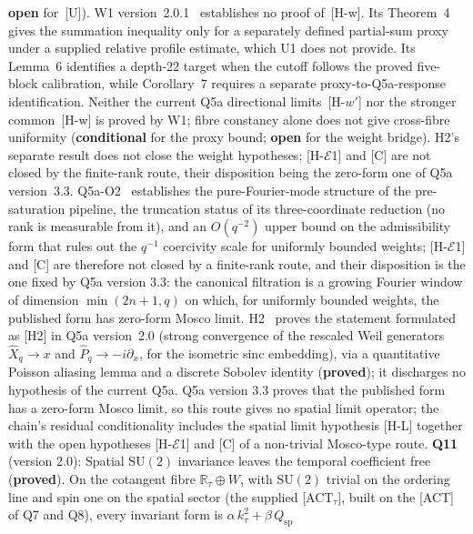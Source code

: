 \documentclass[11pt,a4paper]{article}
\newcommand{\SU}{\mathrm{SU}}
\newcommand{\sproved}{\textcolor{cproved}{\textbf{proved}}}
\newcommand{\sopen}{\textcolor{copen}{\textbf{open}}}
\newcommand{\scond}{\textcolor{ccond}{\textbf{conditional}}}
\begin{document}
    \sopen{} for~[U]).
    W1 version~2.0.1~\cite{Beau2026w1} establishes no proof of~[H-w].
    Its Theorem~4 gives the summation inequality only for a separately defined partial-sum
    proxy under a supplied relative profile estimate, which U1 does not provide.
    Its Lemma~6 identifies a depth-22 target when the cutoff follows the proved five-block
    calibration, while Corollary~7 requires a separate proxy-to-Q5a-response identification.
    Neither the current Q5a directional limits~[H-$w'$] nor the stronger common~[H-w] is proved
    by W1; fibre constancy alone does not give cross-fibre uniformity
    (\scond{} for the proxy bound; \sopen{} for the weight bridge).
    H2's separate result does not close the weight hypotheses; [H-$\mathcal{E}$1] and [C] are
    not closed by the finite-rank route, their disposition being the zero-form one of Q5a version~3.3.
    Q5a-O2~\cite{Beau2026q5ao2} establishes the pure-Fourier-mode structure of the
    pre-saturation pipeline, the truncation status of its three-coordinate reduction (no rank
    is measurable from it), and an $O(q^{-2})$ upper bound on the admissibility form that rules
    out the $q^{-1}$ coercivity scale for uniformly bounded weights; [H-$\mathcal{E}$1] and [C] are therefore
    not closed by a finite-rank route, and their disposition is the one fixed by Q5a version 3.3:
    the canonical filtration
    is a growing Fourier window of dimension $\min(2n+1,q)$ on which, for uniformly bounded weights,
    the published form has zero-form Mosco limit.
    H2~\cite{Beau2026h2} proves the statement formulated as [H2] in Q5a version~2.0 (strong
    convergence of the rescaled Weil generators $\hat{X}_q \to x$ and $\hat{P}_q \to -i\partial_x$,
    for the isometric sinc embedding), via a quantitative Poisson aliasing lemma and a discrete
    Sobolev identity (\sproved{}); it discharges no hypothesis of the current Q5a.
    Q5a version 3.3 proves that the published form has a zero-form Mosco limit, so this route gives no
    spatial limit operator; the chain's residual conditionality includes the spatial limit hypothesis
    [H-L] together with the open hypotheses [H-$\mathcal{E}$1] and [C] of a non-trivial
    Mosco-type route.
    \textbf{Q11}~\cite{Beau2026q11} (version 2.0): Spatial $\SU(2)$ invariance leaves the temporal coefficient free
    (\sproved).
    On the cotangent fibre $\mathbb{R}_\tau\oplus W$, with $\SU(2)$ trivial on the ordering line and spin one on the
    spatial sector (the supplied [ACT$_\tau$], built on the [ACT] of Q7 and Q8), every invariant form is
    $\alpha\,k_\tau^2 + \beta\,Q_{\mathrm{sp}}$
\end{document}
